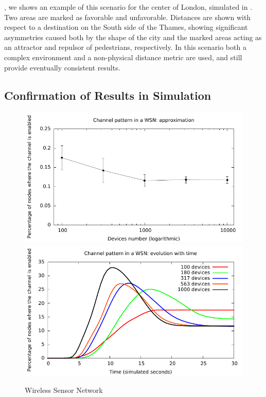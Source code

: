 \documentclass[12pt,a4paper,twoside,openright]{book}
\begin{document}
, we shows an example of this scenario for the center of London, simulated in \alchemist{}.
%
Two areas are marked as favorable and unfavorable.
%
Distances are shown with respect to a destination on the South side of the Thames, showing significant asymmetries caused both by the shape of the city and the marked areas acting as an attractor and repulsor of pedestrians, respectively.
%
In this scenario both a complex environment and a non-physical distance metric are used, and still provide eventually consistent results.

\subsection{Confirmation of Results in Simulation}

\begin{figure}
	\centering
	\includegraphics[width=\textwidth]{img/tetc-graphs/wsn-approx-nosmooth}
	\includegraphics[width=\textwidth]{img/tetc-graphs/wsn-time}
	\caption{Wireless Sensor Network}
	\label{f:tests-wsn}
\end{figure}
\end{document}
